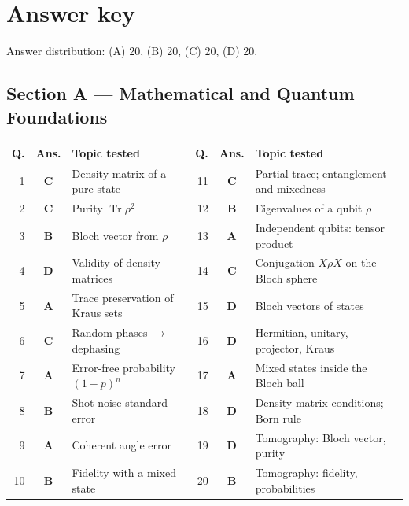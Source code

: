 \documentclass[11pt,a4paper]{article}
\begin{document}
\section*{Answer key}\label{key}
{\small Answer distribution: (A) 20, (B) 20, (C) 20, (D) 20.}

\subsection*{Section A --- Mathematical and Quantum Foundations}
{\small\renewcommand{\arraystretch}{1.15}
\begin{tabularx}{\linewidth}{@{}r c L @{\hspace{1em}} r c L@{}}
\toprule
\textbf{Q.} & \textbf{Ans.} & \textbf{Topic tested} & \textbf{Q.} & \textbf{Ans.} & \textbf{Topic tested}\\  & \textbf{C} & Density matrix of a pure state & 11 & \textbf{C} & Partial trace; entanglement and mixedness \\
2 & \textbf{C} & Purity $\operatorname{Tr}\rho^2$ & 12 & \textbf{B} & Eigenvalues of a qubit $\rho$ \\
3 & \textbf{B} & Bloch vector from $\rho$ & 13 & \textbf{A} & Independent qubits: tensor product \\
4 & \textbf{D} & Validity of density matrices & 14 & \textbf{C} & Conjugation $X\rho X$ on the Bloch sphere \\
5 & \textbf{A} & Trace preservation of Kraus sets & 15 & \textbf{D} & Bloch vectors of states \\
6 & \textbf{C} & Random phases $\to$ dephasing & 16 & \textbf{D} & Hermitian, unitary, projector, Kraus \\
7 & \textbf{A} & Error-free probability $(1-p)^n$ & 17 & \textbf{A} & Mixed states inside the Bloch ball \\
8 & \textbf{B} & Shot-noise standard error & 18 & \textbf{D} & Density-matrix conditions; Born rule \\
9 & \textbf{A} & Coherent angle error & 19 & \textbf{D} & Tomography: Bloch vector, purity \\
10 & \textbf{B} & Fidelity with a mixed state & 20 & \textbf{B} & Tomography: fidelity, probabilities \\
\bottomrule
\end{tabularx}}

\end{document}
